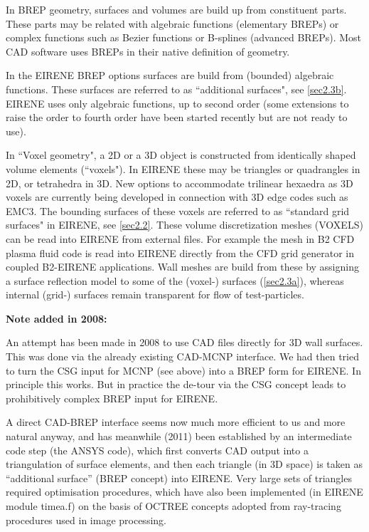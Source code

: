 In \ac{BREP} geometry, surfaces and volumes are build up from constituent
parts.
These parts may be related with algebraic functions (elementary \acp{BREP}) or
complex functions such as Bezier functions or B-splines (advanced \acp{BREP}).
Most \ac{CAD} software uses \acp{BREP} in their native definition of geometry.

In the EIRENE \ac{BREP} options surfaces are build from (bounded) algebraic
functions.
These surfaces are referred to as ``additional surfaces", see \cref{sec2.3b}.
EIRENE uses only algebraic functions, up to second order (some	extensions to
raise the order to fourth order have been started recently but are not ready to
use).

\medskip

In ``Voxel geometry", a 2D or a 3D object is constructed from identically
shaped volume elements (``voxels").
In EIRENE these may be triangles or quadrangles in 2D, or tetrahedra in 3D.
New options to accommodate trilinear hexaedra as 3D voxels are currently being
developed in connection with 3D edge codes such as EMC3.
The bounding surfaces of these voxels are referred to as ``standard grid
surfaces" in EIRENE, see \cref{sec2.2}.
These volume discretization meshes (VOXELS) can be read into EIRENE from
external files.
For example the mesh in B2 \ac{CFD} plasma fluid code is read into EIRENE
directly from the \ac{CFD} grid generator in coupled B2-EIRENE applications.
Wall meshes are build from these by assigning a surface reflection model to
some of the (voxel-) surfaces (\cref{sec2.3a}), whereas internal (grid-)
surfaces remain transparent for flow of test-particles.

\textbf{Note added in 2008:} 

An attempt has been made in 2008 to use \ac{CAD} files directly for 3D wall
surfaces.
This was done via the already existing \acs{CAD}-\acs{MCNP} interface.
We had then tried to turn the \ac{CSG} input for \ac{MCNP} (see above) into a
\ac{BREP} form for EIRENE.
In principle this works.
But in practice the de-tour via the \ac{CSG} concept leads to prohibitively
complex \ac{BREP} input for EIRENE.

A direct \acs{CAD}-\acs{BREP} interface seems now much more efficient to us and
more natural anyway, and has meanwhile (2011) been established by an
intermediate code step (the ANSYS code), which first converts \ac{CAD} output
into a triangulation of surface elements, and then each triangle (in 3D space)
is taken as ``additional surface'' (\ac{BREP} concept) into EIRENE.
Very large sets of triangles required optimisation procedures, which have  also
been implemented (in EIRENE module timea.f) on the basis of OCTREE concepts
adopted from ray-tracing procedures used in image processing.

